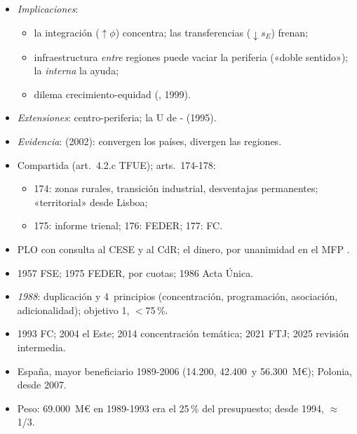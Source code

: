\documentclass{article}
\begin{document}
\begin{columnas}
\begin{itemize}
  \begin{itemize}
  \item mercado doméstico amplificado; aglomeración total en $\phi^{\mathrm{CP}}=\frac{1-s_E}{s_E}$.
  \end{itemize}
\item \emph{Implicaciones}:
  \begin{itemize}
  \item la integración ($\uparrow\phi$) concentra; las transferencias ($\downarrow s_E$) frenan;
  \item infraestructura \emph{entre} regiones puede vaciar la periferia («doble sentido»); la \emph{interna} la ayuda;
  \item dilema crecimiento-equidad (, 1999).
  \end{itemize}
\item \emph{Extensiones}: centro-periferia; la U de - (1995).
\item \emph{Evidencia}:  (2002): convergen los países, divergen las regiones.
\end{itemize}

\begin{itemize}
\item Compartida (art.~4.2.c TFUE); arts.~174-178:
  \begin{itemize}
  \item 174: zonas rurales, transición industrial, desventajas permanentes; «territorial» desde Lisboa;
  \item 175: informe trienal; 176: FEDER; 177: FC.
  \end{itemize}
\item PLO con consulta al CESE y al CdR; el dinero, por unanimidad en el MFP .
\end{itemize}

\begin{itemize}
\item 1957 FSE; 1975 FEDER, por cuotas; 1986 Acta Única.
\item \emph{1988}: duplicación y 4~principios (concentración, programación, asociación, adicionalidad); objetivo 1, $<$75\,\%.
\item 1993 FC; 2004 el Este; 2014 concentración temática; 2021 FTJ; 2025 revisión intermedia.
\item España, mayor beneficiario 1989-2006 (14.200, 42.400~y 56.300~M€); Polonia, desde 2007.
\item Peso: 69.000~M€ en 1989-1993 era el 25\,\% del presupuesto; desde 1994, $\approx$1/3.
\end{itemize}


\end{columnas}
\end{document}
